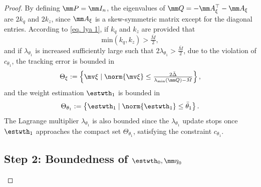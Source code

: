 \documentclass[letterpaper, 10 pt, conference]{ieeeconf}  %
\begin{document}
\begin{proof}
By defining $\mm P=\mm I_n$, the eigenvalues of $\mm Q=-\mm A_\xi^\top -\mm A_\xi$ are $2k_q$ and $2k_z$, since $\mm A_\xi$ is a skew-symmetric matrix except for the diagonal entries.
According to \eqref{eq. lya 1}, if $k_q$ and $k_z$ are provided that
\begin{equation}
    \text{min}(k_q,k_z)>\tfrac{\bar M}{2}
    ,
    \label{eq. ctrl stable condition}
\end{equation}
and if $\lambda_{\theta_1}$ is increased sufficiently large such that $2\lambda_{\theta_1}>\tfrac{\bar M}{2}$, due to the violation of $c_{\theta_1}$, the tracking error is bounded in
\begin{equation}
    \Theta_\xi := 
    \left\{
        \mv\xi\mid
        \norm{\mv\xi}
        \le  
        \tfrac{
            2\bar \Delta
        }{
            \lambda _\text{min}(\mm Q)-{\bar M}
        } 
    \right\}
    ,
\end{equation}
and the weight estimation $\estwth_1$ is bounded in
\begin{equation}
    \Theta_{{\theta}_1} := 
    \left\{ 
        {\estwth_1} 
        \mid
        \norm{\estwth_1}
        \le  
        \bar\theta_1
    \right\}
    .
\end{equation}
The Lagrange multiplier $\lambda_{\theta_1}$ is also bounded since the $\lambda_{\theta_1}$ update stops once ${\estwth}_1$ approaches the compact set $\Theta_{{\theta}_1}$, satisfying the constraint $c_{\theta_1}$.

\subsection*{Step 2: Boundedness of ${\estwth}_0,{\mm \eta}_0$}


\end{proof}
\end{document}
